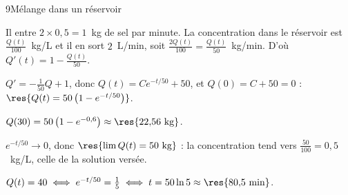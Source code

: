 \begin{corrige}{9}{Mélange dans un réservoir}
\begin{questions}
  \item Il entre $2\times0{,}5=1$~kg de sel par minute. La concentration dans le réservoir est $\frac{Q(t)}{100}$~kg/L et il en sort
    $2$~L/min, soit $\frac{2Q(t)}{100}=\frac{Q(t)}{50}$~kg/min. D'où $Q'(t)=1-\frac{Q(t)}{50}$.
  \item $Q'=-\frac{1}{50}Q+1$, donc $Q(t)=Ce^{-t/50}+50$, et $Q(0)=C+50=0$ : $\res{Q(t)=50\left(1-e^{-t/50}\right)}$.
  \item $Q(30)=50\left(1-e^{-0{,}6}\right)\approx\res{22{,}56\text{ kg}}$.
  \item $e^{-t/50}\to0$, donc $\res{\lim Q(t)=50\text{ kg}}$ : la concentration tend vers $\frac{50}{100}=0{,}5$~kg/L, celle de la solution versée.
  \item $Q(t)=40\iff e^{-t/50}=\frac15\iff t=50\ln5\approx\res{80{,}5\text{ min}}$.
\end{questions}
\end{corrige}

